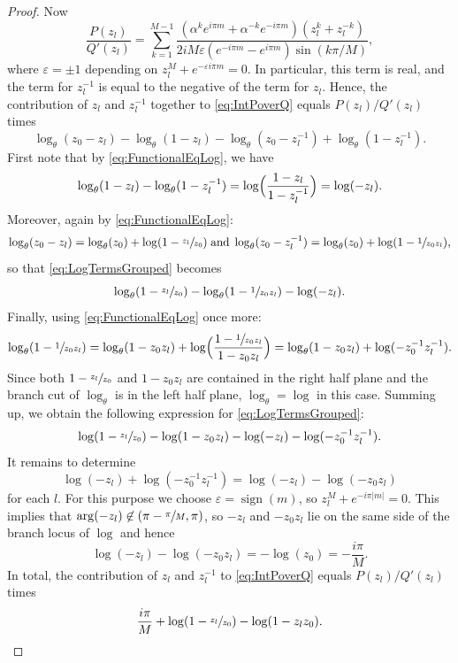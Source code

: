 \documentclass[JEP,XML,SOM,Unicode,NoFloatCountersInSection,published]{cedram}
\theoremstyle{plain}
\theoremstyle{definition}
\theoremstyle{remark}
\DeclareMathOperator{\sign}{sign}
\numberwithin{equation}{section}
\begin{document}
\begin{proof}
Now
\[
\frac{P(z_l)}{Q'(z_l)} = \sum_{k=1}^{M-1} \frac {(\alpha^k e^{i\pi m} + \alpha^{-k}e^{-i\pi m})(z_l^k+z_l^{-k})}{2iM \varepsilon (e^{-i\pi m}-e^{i\pi m}) \sin(k\pi/M)},
\]
where $\varepsilon = \pm 1$ depending on $z_l^M + e^{-\varepsilon i\pi m}=0$. In particular, this term is real, and the term for $z_l^{-1}$ is equal to the negative of the term for $z_l$. Hence, the contribution of $z_l$ and $z_l^{-1}$ together to \cref{eq:IntPoverQ} equals $P(z_l)/Q'(z_l)$ times
\begin{equation}
\log\nolimits_\theta(z_0-z_l)-\log\nolimits_\theta(1-z_l)-\log\nolimits_\theta(z_0-z_l^{-1})+\log\nolimits_\theta(1-z_l^{-1}).\label{eq:LogTermsGrouped}
\end{equation}
First note that by \cref{eq:FunctionalEqLog}, we have
\[
\log\nolimits_\theta(1-z_l)-\log\nolimits_\theta(1-z_l^{-1}) = \log\Bigl(\frac{1-z_l}{1-z_l^{-1}}\Bigr) = \log(-z_l).
\]
Moreover, again by \cref{eq:FunctionalEqLog}:
\[
\log\nolimits_\theta(z_0-z_l) = \log\nolimits_\theta(z_0) + \log(1-\sfrac{z_l}{z_0}) \; \text{and} \; \log\nolimits_\theta(z_0-z_l^{-1}) = \log\nolimits_\theta(z_0) + \log(1-\sfrac{1}{z_0z_l}),
\]
so that \cref{eq:LogTermsGrouped} becomes
\[
\log\nolimits_\theta(1-\sfrac{z_l}{z_0})-\log\nolimits_\theta(1-\sfrac{1}{z_0z_l})-\log(-z_l).
\]
Finally, using \cref{eq:FunctionalEqLog} once more:
\[
\log\nolimits_\theta(1-\sfrac{1}{z_0z_l}) = \log\nolimits_\theta(1-z_0z_l) + \log\Bigl(\frac{1-\sfrac{1}{z_0z_l}}{1-z_0z_l}\Bigr) = \log\nolimits_\theta(1-z_0z_l) + \log(-z_0^{-1}z_l^{-1}).
\]
Since both $1-\sfrac{z_l}{z_0}$ and $1-z_0z_l$ are contained in the right half plane and the branch cut of $\log\nolimits_\theta$ is in the left half plane, $\log\nolimits_\theta=\log$ in this case. Summing up, we obtain the following expression for \cref{eq:LogTermsGrouped}:
\[
\log(1-\sfrac{z_l}{z_0})-\log(1-z_0z_l)-\log(-z_l)-\log(-z_0^{-1}z_l^{-1}).
\]
It remains to determine
\[
\log(-z_l)+\log(-z_0^{-1}z_l^{-1}) = \log(-z_l)-\log(-z_0z_l)
\]
for each $l$. For this purpose we choose $\varepsilon=\sign(m)$, so $z_l^M+e^{-i\pi|m|}=0$. This implies that $\arg(-z_l)\not\in(\pi-\sfrac{\pi}{M},\pi)$, so $-z_l$ and $-z_0z_l$ lie on the same side of the branch locus of $\log$ and hence
\[
\log(-z_l)-\log(-z_0z_l) = -\log(z_0) = -\frac{i\pi}{M}.
\]
In total, the contribution of $z_l$ and $z_l^{-1}$ to \cref{eq:IntPoverQ} equals $P(z_l)/Q'(z_l)$ times
\begin{equation}
\frac {i\pi}{M} + \log(1-\sfrac {z_l}{z_0}) - \log(1-z_l z_0).\label{eq:LogRearrangement}
\end{equation}


\end{proof}
\end{document}
